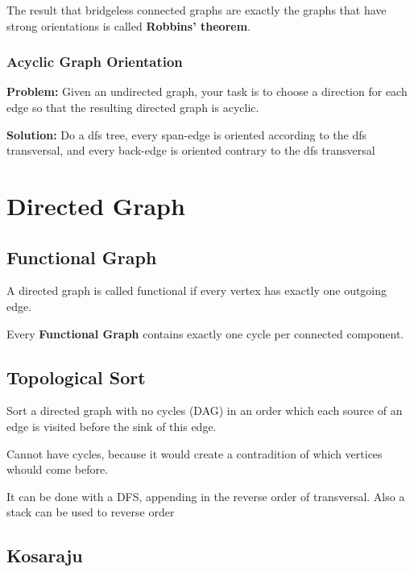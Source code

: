 	The result that bridgeless connected graphs are exactly the graphs that have strong orientations is called \textbf{Robbins' theorem}.

		\subsubsection{Acyclic Graph Orientation}

			\textbf{Problem:} Given an undirected graph, your task is to choose a direction for each edge so that the resulting directed graph is acyclic.

			\textbf{Solution:} Do a dfs tree, every span-edge is oriented according to the dfs transversal,
			and every back-edge is oriented contrary to the dfs transversal


\section{Directed Graph}

\subsection{Functional Graph}

		A directed graph is called functional if every vertex has exactly one outgoing edge.

		Every \textbf{Functional Graph} contains exactly one cycle per connected component.

\subsection{Topological Sort}

	Sort a directed graph with no cycles (DAG) in an order which each source of an edge is visited before the sink of this edge.

	Cannot have cycles, because it would create a contradition of which vertices whould come before.

	It can be done with a DFS, appending in the reverse order of transversal. Also a stack can be used to reverse order	

	
\subsection{Kosaraju}

